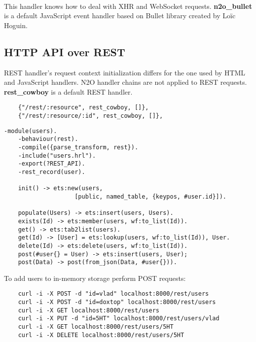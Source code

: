 \paragraph{}
This handler knows how to deal with XHR and WebSocket requests.
{\bf {n2o}\_{bullet}} is a default JavaScript event handler
based on Bullet library created by Loïc Hoguin.

\newpage
\subsection{HTTP API over REST}
REST handler's request context initialization differs for the one
used by HTML and JavaScript handlers. N2O handler chains are not
applied to REST requests. {\bf rest\_cowboy} is a default REST
handler.

\vspace{1\baselineskip}
\begin{lstlisting}
    {"/rest/:resource", rest_cowboy, []},
    {"/rest/:resource/:id", rest_cowboy, []},
\end{lstlisting}

\lstset{captionpos=b}
\vspace{1\baselineskip}
\begin{lstlisting}[caption=users.erl]
    -module(users).
    -behaviour(rest).
    -compile({parse_transform, rest}).
    -include("users.hrl").
    -export(?REST_API).
    -rest_record(user).

    init() -> ets:new(users, 
                    [public, named_table, {keypos, #user.id}]).

    populate(Users) -> ets:insert(users, Users).
    exists(Id) -> ets:member(users, wf:to_list(Id)).
    get() -> ets:tab2list(users).
    get(Id) -> [User] = ets:lookup(users, wf:to_list(Id)), User.
    delete(Id) -> ets:delete(users, wf:to_list(Id)).
    post(#user{} = User) -> ets:insert(users, User);
    post(Data) -> post(from_json(Data, #user{})).
\end{lstlisting}
\vspace{1\baselineskip}

To add users to in-memory storage perform POST requests:

\vspace{1\baselineskip}
\begin{lstlisting}
    curl -i -X POST -d "id=vlad" localhost:8000/rest/users
    curl -i -X POST -d "id=doxtop" localhost:8000/rest/users
    curl -i -X GET localhost:8000/rest/users
    curl -i -X PUT -d "id=5HT" localhost:8000/rest/users/vlad
    curl -i -X GET localhost:8000/rest/users/5HT
    curl -i -X DELETE localhost:8000/rest/users/5HT
\end{lstlisting}
\vspace{1\baselineskip}

